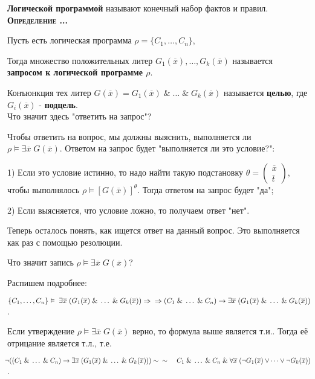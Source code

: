 \documentclass[18pt, a4paper]{extarticle}
\newcounter{par}
\newcounter{spar}
\newcounter{zap}
\newcommand{\opr}{\textbf{\textsc{Определение \thepar.\if\thespar1\thespar.\fi\thezap.\;}}\stepcounter{zap}}
\newcommand{\ovl}[1]{\overline{#1}}
\newcommand{\ampersand}{\;\&\;}
\newcommand{\vD}{\vDash}
\newcommand{\lot}[3]{#1_#2,\dots,#1_#3}
\begin{document}
\textbf{Логической программой} называют конечный набор фактов и правил.\\

\opr

Пусть есть логическая программа $\rho=\{\lot C 1 n\}$, 

Тогда множество положительных литер $G_1(\ovl x),\dots,G_k(\ovl x)$ называется\\ \textbf{запросом к логической программе $\rho$}.

Конъюнкция тех литер $G(\ovl x)=G_1(\ovl x)\ampersand\dots\ampersand G_k(\ovl x)$ называется \textbf{целью}, где $G_i(\ovl x)$ - \textbf{подцель}.\\

Что значит здесь "ответить на запрос"{}?

Чтобы ответить на вопрос, мы должны выяснить, выполняется ли\\ $\rho\vD\exists\ovl x\;G(\ovl x)$. Ответом на запрос будет "выполняется ли это условие?"{}:

1) Если это условие истинно, то надо найти такую подстановку $\theta=\begin{pmatrix}\ovl x\\\ovl t\end{pmatrix}$, чтобы выполнялось $\rho\vD[G(\ovl x)]^\theta$. Тогда ответом на запрос будет "да"{};

2) Если выясняется, что условие ложно, то получаем ответ "нет"{}.

Теперь осталось понять, как ищется ответ на данный вопрос. Это выполняется как раз с помощью резолюции.

Что значит запись $\rho\vD\exists\ovl x\;G(\ovl x)$? 

Распишем подробнее:

$\{\lot C 1 n\}\vD\;\exists\ovl x\;(G_1(\ovl x)\ampersand\dots\ampersand G_k(\ovl x))\Rightarrow\newline\Rightarrow(C_1\ampersand\dots\ampersand C_n)\to\exists\ovl x\;(G_1(\ovl x)\ampersand\dots\ampersand G_k(\ovl x))$.

Если утверждение $\rho\vD\exists\ovl x\;G(\ovl x)$ верно, то формула выше является т.и.. Тогда её отрицание является т.л., т.е.

$\!\!\!\lnot((C_1\ampersand\dots\ampersand C_n)\to\exists\ovl x\;(G_1(\ovl x)\ampersand\dots\ampersand G_k(\ovl x)))\sim\newline\sim\;\;\;\;C_1\ampersand\dots\ampersand C_n\ampersand\forall\ovl x\;(\lnot G_1(\ovl x)\vee\dots\vee\lnot G_k(\ovl x))$.
\end{document}
